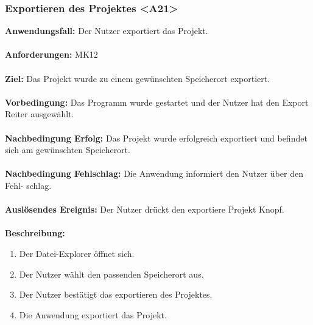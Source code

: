 \documentclass[parskip=full]{scrartcl} %
\begin{document}
\subsubsection*{Exportieren des Projektes <A21>}
\textbf{Anwendungsfall:} Der Nutzer exportiert das Projekt. \\\\
\textbf{Anforderungen:} MK12\\\\
\textbf{Ziel:} Das Projekt wurde zu einem gewünschten Speicherort exportiert.\\\\
\textbf{Vorbedingung:} Das Programm wurde gestartet und der Nutzer hat den Export Reiter ausgewählt.\\\\
\textbf{Nachbedingung Erfolg:} Das Projekt wurde erfolgreich exportiert und befindet sich am gewünschten Speicherort.\\\\
\textbf{Nachbedingung Fehlschlag:} Die Anwendung informiert den Nutzer über den Fehl-  
schlag.\\\\
\textbf{Auslösendes Ereignis:}  Der Nutzer drückt den exportiere Projekt Knopf. \\\\
\textbf{Beschreibung:}
\begin{enumerate}
    \item Der Datei-Explorer öffnet sich.
    \item Der Nutzer wählt den passenden Speicherort aus.
    \item Der Nutzer bestätigt das exportieren des Projektes.
    \item Die Anwendung exportiert das Projekt.
\end{enumerate}
\newpage
\end{document}
